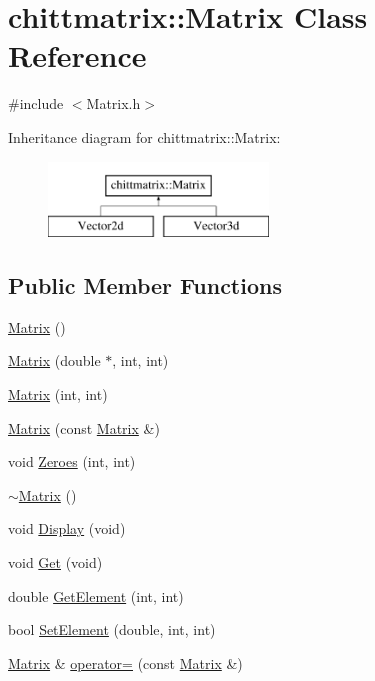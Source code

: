 \hypertarget{classchittmatrix_1_1Matrix}{\section{chittmatrix\-:\-:\-Matrix \-Class \-Reference}
\label{classchittmatrix_1_1Matrix}
}


{\ttfamily \#include $<$\-Matrix.\-h$>$}

\-Inheritance diagram for chittmatrix\-:\-:\-Matrix\-:\begin{figure}[H]
\begin{center}
\leavevmode
\includegraphics[height=2.000000cm]{classchittmatrix_1_1Matrix}
\end{center}
\end{figure}
\subsection*{\-Public \-Member \-Functions}
\begin{DoxyCompactItemize}
\item 
\hyperlink{classchittmatrix_1_1Matrix_ad58cf615c96778a1098003ea90848b3b}{\-Matrix} ()
\item 
\hyperlink{classchittmatrix_1_1Matrix_ab53232b2ed2484b83c2c5b8c989bddc8}{\-Matrix} (double $\ast$, int, int)
\item 
\hyperlink{classchittmatrix_1_1Matrix_a2c5ff19978df7737a74d0ed1bbc579d4}{\-Matrix} (int, int)
\item 
\hyperlink{classchittmatrix_1_1Matrix_a28063166bcb3ccf22609efb910019c42}{\-Matrix} (const \hyperlink{classchittmatrix_1_1Matrix}{\-Matrix} \&)
\item 
void \hyperlink{classchittmatrix_1_1Matrix_ad249017ca911fe565ea1f0287eeeb6ec}{\-Zeroes} (int, int)
\item 
\hyperlink{classchittmatrix_1_1Matrix_a8e6ac27f11872b9111d235983b24ee62}{$\sim$\-Matrix} ()
\item 
void \hyperlink{classchittmatrix_1_1Matrix_a61e8ae9976c1f9a0227492abfb242784}{\-Display} (void)
\item 
void \hyperlink{classchittmatrix_1_1Matrix_a489c3c08d25d53fa59a67e8e57e7ce21}{\-Get} (void)
\item 
double \hyperlink{classchittmatrix_1_1Matrix_a1099979ca687000b29ae95bb3d50d5dd}{\-Get\-Element} (int, int)
\item 
bool \hyperlink{classchittmatrix_1_1Matrix_acb094736c22c73105003f02da1c75c7d}{\-Set\-Element} (double, int, int)
\item 
\hyperlink{classchittmatrix_1_1Matrix}{\-Matrix} \& \hyperlink{classchittmatrix_1_1Matrix_a1ccb184ce5907bc7df2edb234db9bab8}{operator=} (const \hyperlink{classchittmatrix_1_1Matrix}{\-Matrix} \&)
\end{DoxyCompactItemize}
